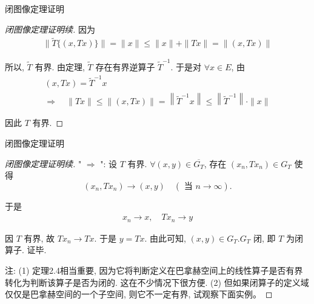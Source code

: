 \documentclass[sans,mathserif]{beamer} %
\begin{document}
\begin{frame}{闭图像定理证明}
		\begin{proof}[闭图像定理证明续]
因为
\begin{align*}
	\|\widetilde{T}\{(x, T x)\}\|=\|x\| \leq\|x\|+\|T x\|=\|(x, T x)\|
\end{align*}

所以, $ \widetilde{T}$  有界.
由定理, $ \widetilde{T} $ 存在有界逆算子 $ \widetilde{T}^{-1} $.
于是对 $ \forall x \in E$,  由
\begin{gather*}
(x, T x)=\widetilde{T}^{-1} x \\
\Longrightarrow \quad\|T x\| \leq\|(x, T x)\|=\left\|\widetilde{T}^{-1} x\right\| \leq\left\|\widetilde{T}^{-1}\right\| \cdot\|x\|
\end{gather*}

因此 $ T $ 有界.
	\end{proof}
\end{frame}


\begin{frame}{闭图像定理证明}
	\begin{proof}[闭图像定理证明续]
		" $\Rightarrow$ ":   设 $ T $ 有界.  $\forall(x, y) \in \overline{G_{T}}$,  存在 $ \left(x_{n}, T x_{n}\right) \in G_{T}$  使得
\begin{equation*}
	\left(x_{n}, T x_{n}\right) \rightarrow(x, y) \quad(\text { 当 } n \rightarrow \infty) .
\end{equation*}
	
		于是
		\begin{align*}
			x_{n} \rightarrow x, \quad T x_{n} \rightarrow y
		\end{align*}
		
	因 $ T $ 有界, 故 $ T x_{n} \rightarrow T x $.  于是 $ y=T x $.  由此可知, $ (x, y) \in G_{T} $.$ G_{T}$  闭, 即 $ T $ 为闭算子. 证毕.

注: (1) 定理2.4相当重要, 因为它将判断定义在巴拿赫空间上的线性算子是否有界转化为判断该算子是否为闭的. 这在不少情况下很方便.
	(2) 但如果闭算子的定义域仅仅是巴拿赫空间的一个子空间, 则它不一定有界, 试观察下面实例。
\end{proof}
\end{frame}
\end{document}
